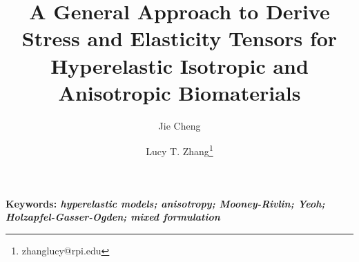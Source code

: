 \documentclass{article}[12pt]
\begin{document}
\title{A General Approach to Derive Stress and Elasticity Tensors for Hyperelastic Isotropic and Anisotropic Biomaterials}
\author[1]{Jie Cheng}
\author[1]{Lucy T. Zhang\thanks{zhanglucy@rpi.edu}}


\maketitle

\textbf{Keywords: \textit{hyperelastic models; anisotropy; Mooney-Rivlin; Yeoh; Holzapfel-Gasser-Ogden; mixed formulation}}








%
\clearpage

\end{document}
